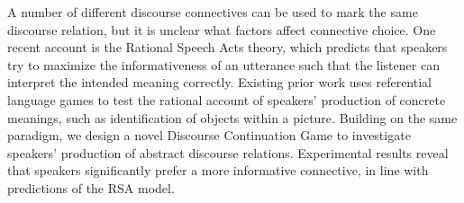 A  number of different discourse connectives can be used to mark the same discourse relation, but it is unclear what factors affect  connective choice. One recent account is the Rational Speech Acts theory, which predicts that speakers try to maximize the informativeness of an utterance such that the listener can interpret the intended meaning correctly. Existing prior work uses referential language games to test the rational account of speakers' production of concrete meanings, such as identification of objects within a picture. Building on the same paradigm, we design a novel Discourse Continuation Game to investigate speakers' production of abstract discourse relations. Experimental results reveal that speakers significantly prefer a more informative connective, in line with predictions of the RSA model.
